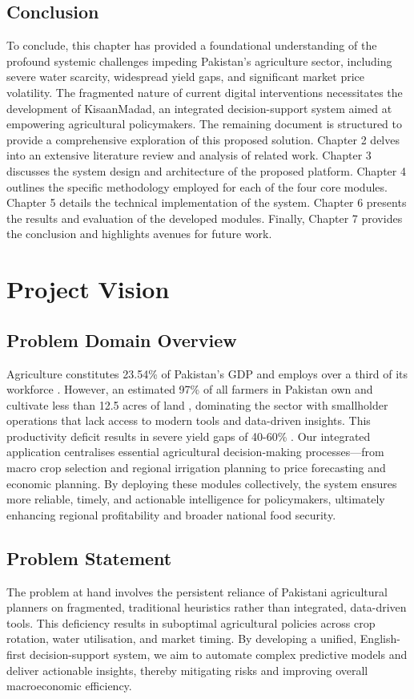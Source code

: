 \documentclass{FastFyp}
\begin{document}
\section{Conclusion}
To conclude, this chapter has provided a foundational understanding of the profound systemic challenges impeding Pakistan's agriculture sector, including severe water scarcity, widespread yield gaps, and significant market price volatility. The fragmented nature of current digital interventions necessitates the development of KisaanMadad, an integrated decision-support system aimed at empowering agricultural policymakers. The remaining document is structured to provide a comprehensive exploration of this proposed solution. Chapter 2 delves into an extensive literature review and analysis of related work. Chapter 3 discusses the system design and architecture of the proposed platform. Chapter 4 outlines the specific methodology employed for each of the four core modules. Chapter 5 details the technical implementation of the system. Chapter 6 presents the results and evaluation of the developed modules. Finally, Chapter 7 provides the conclusion and highlights avenues for future work.
\chapter{Project Vision}

\section{Problem Domain Overview}
Agriculture constitutes 23.54\% of Pakistan's GDP and employs over a third of its workforce \cite{pakistan_economic_survey_2025}. However, an estimated 97\% of all farmers in Pakistan own and cultivate less than 12.5 acres of land \cite{rana2025farmers}, dominating the sector with smallholder operations that lack access to modern tools and data-driven insights. This productivity deficit results in severe yield gaps of 40-60\% \cite{adb2021pakistan}. Our integrated application centralises essential agricultural decision-making processes---from macro crop selection and regional irrigation planning to price forecasting and economic planning. By deploying these modules collectively, the system ensures more reliable, timely, and actionable intelligence for policymakers, ultimately enhancing regional profitability and broader national food security.

\section{Problem Statement}
The problem at hand involves the persistent reliance of Pakistani agricultural planners on fragmented, traditional heuristics rather than integrated, data-driven tools. This deficiency results in suboptimal agricultural policies across crop rotation, water utilisation, and market timing. By developing a unified, English-first decision-support system, we aim to automate complex predictive models and deliver actionable insights, thereby mitigating risks and improving overall macroeconomic efficiency.
\end{document}
